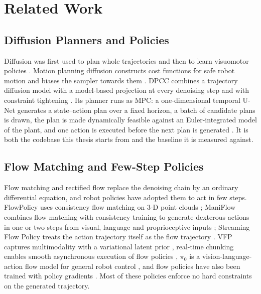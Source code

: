 \chapter{Related Work}\label{ch:related}

\section{Diffusion Planners and Policies}\label{sec:rel:diffusion}

Diffusion was first used to plan whole trajectories \parencite{janner2022planning} and then to learn
visuomotor policies \parencite{chi2023diffusion}. Motion planning diffusion constructs cost functions
for safe robot motion and biases the sampler towards them \parencite{carvalho2025motion}. \ac{DPCC}
combines a trajectory diffusion model with a model-based projection at every denoising step and with
constraint tightening \parencite{romer2025diffusion}. Its planner runs as \ac{MPC}: a one-dimensional
temporal U-Net generates a state--action plan over a fixed horizon, a batch of candidate plans is
drawn, the plan is made dynamically feasible against an Euler-integrated model of the plant, and one
action is executed before the next plan is generated \parencite[Sec.~5]{romer2025diffusion}. It is
both the codebase this thesis starts from and the baseline it is measured against.

\section{Flow Matching and Few-Step Policies}\label{sec:rel:fm}

Flow matching \parencite{lipman2023flow,lipman2024guide} and rectified flow \parencite{liu2023flow}
replace the denoising chain by an ordinary differential equation, and robot policies have adopted them
to act in few steps. FlowPolicy uses consistency flow matching on 3-D point clouds
\parencite{zhang2024flowpolicy}; ManiFlow combines flow matching with consistency training to generate
dexterous actions in one or two steps from visual, language and proprioceptive inputs
\parencite{yan2025maniflow}; Streaming Flow Policy treats the action trajectory itself as the flow
trajectory \parencite{jiang2025streaming}. VFP captures multimodality with a variational latent prior
\parencite{zhai2025vfp}, real-time chunking enables smooth asynchronous execution of flow policies
\parencite{black2025rtc}, $\pi_0$ is a vision-language-action flow model for general robot control
\parencite{black2024pi0}, and flow policies have also been trained with policy gradients
\parencite{yi2026fpg}. Most of these policies enforce no hard constraints on the generated
trajectory.

